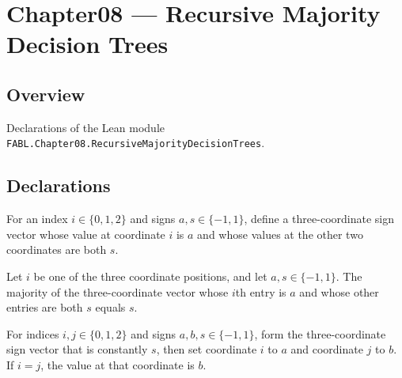 \chapter{Chapter08 — Recursive Majority Decision Trees}
\section{Overview}

Declarations of the Lean module \texttt{FABL.Chapter08.RecursiveMajorityDecisionTrees}.

\section{Declarations}

\begin{definition}
\label{FABL.majorityThreeFixedOneInput}
\leanok
{}
For an index $i\in\{0,1,2\}$ and signs $a,s\in\{-1,1\}$, define a three-coordinate sign
vector whose value at coordinate $i$ is $a$ and whose values at the other two
coordinates are both $s$.
\end{definition}

\begin{theorem}
\label{FABL.majority_majorityThreeFixedOneInput}
\leanok
{}
Let $i$ be one of the three coordinate positions, and let $a,s\in\{-1,1\}$. The majority
of the three-coordinate vector whose $i$th entry is $a$ and whose other entries are both
$s$ equals $s$.
\end{theorem}

\begin{definition}
\label{FABL.majorityThreeFixedTwoInput}
\leanok
{}
For indices $i,j\in\{0,1,2\}$ and signs $a,b,s\in\{-1,1\}$, form the three-coordinate
sign vector that is constantly $s$, then set coordinate $i$ to $a$ and coordinate $j$ to
$b$. If $i=j$, the value at that coordinate is $b$.
\end{definition}

